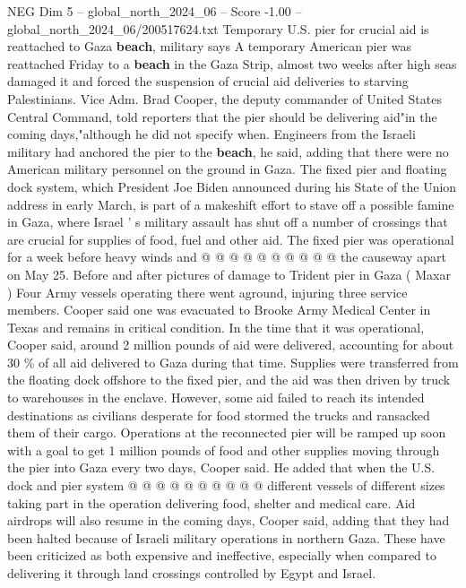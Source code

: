 \begin{textsample}{NEG Dim 5 – global\_north\_2024\_06 – Score -1.00 – global\_north\_2024\_06/200517624.txt}  \label{ex:f5_neg_084}
Temporary U.S. pier for crucial aid is reattached to Gaza \textbf{beach}, military says A temporary American pier was reattached Friday to a \textbf{beach} in the Gaza Strip, almost two weeks after high seas damaged it and forced the suspension of crucial aid deliveries to starving Palestinians.
Vice Adm.
Brad Cooper, the deputy commander of United States Central Command, told reporters that the pier should be delivering aid"in the coming days,"although he did not specify when.
Engineers from the Israeli military had anchored the pier to the \textbf{beach}, he said, adding that there were no American military personnel on the ground in Gaza.
The fixed pier and floating dock system, which President Joe Biden announced during his State of the Union address in early March, is part of a makeshift effort to stave off a possible famine in Gaza, where Israel ' s military assault has shut off a number of crossings that are crucial for supplies of food, fuel and other aid.
The fixed pier was operational for a week before heavy winds and @ @ @ @ @ @ @ @ @ @ the causeway apart on May 25.
Before and after pictures of damage to Trident pier in Gaza ( Maxar ) Four Army vessels operating there went aground, injuring three service members.
Cooper said one was evacuated to Brooke Army Medical Center in Texas and remains in critical condition.
In the time that it was operational, Cooper said, around 2 million pounds of aid were delivered, accounting for about 30 \% of all aid delivered to Gaza during that time.
Supplies were transferred from the floating dock offshore to the fixed pier, and the aid was then driven by truck to warehouses in the enclave.
However, some aid failed to reach its intended destinations as civilians desperate for food stormed the trucks and ransacked them of their cargo.
Operations at the reconnected pier will be ramped up soon with a goal to get 1 million pounds of food and other supplies moving through the pier into Gaza every two days, Cooper said.
He added that when the U.S. dock and pier system @ @ @ @ @ @ @ @ @ @ different vessels of different sizes taking part in the operation delivering food, shelter and medical care.
Aid airdrops will also resume in the coming days, Cooper said, adding that they had been halted because of Israeli military operations in northern Gaza.
These have been criticized as both expensive and ineffective, especially when compared to delivering it through land crossings controlled by Egypt and Israel.

\end{textsample}
